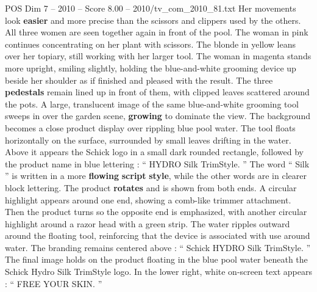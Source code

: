 \begin{textsample}{POS Dim 7 – 2010 – Score 8.00 – 2010/tv\_com\_2010\_81.txt}
Her movements look \textbf{easier} and more precise than the scissors and clippers used by the others.
All three women are seen together again in front of the pool.
The woman in pink continues concentrating on her plant with scissors.
The blonde in yellow leans over her topiary, still working with her larger tool.
The woman in magenta stands more upright, smiling slightly, holding the blue-and-white grooming device up beside her shoulder as if finished and pleased with the result.
The three \textbf{pedestals} remain lined up in front of them, with clipped leaves scattered around the pots.
A large, translucent image of the same blue-and-white grooming tool sweeps in over the garden scene, \textbf{growing} to dominate the view.
The background becomes a close product display over rippling blue pool water.
The tool floats horizontally on the surface, surrounded by small leaves drifting in the water.
Above it appears the Schick logo in a small dark rounded rectangle, followed by the product name in blue lettering : “ HYDRO Silk TrimStyle. ” The word “ Silk ” is written in a more \textbf{flowing} \textbf{script} \textbf{style}, while the other words are in clearer block lettering.
The product \textbf{rotates} and is shown from both ends.
A circular highlight appears around one end, showing a comb-like trimmer attachment.
Then the product turns so the opposite end is emphasized, with another circular highlight around a razor head with a green strip.
The water ripples outward around the floating tool, reinforcing that the device is associated with use around water.
The branding remains centered above : “ Schick HYDRO Silk TrimStyle. ” The final image holds on the product floating in the blue pool water beneath the Schick Hydro Silk TrimStyle logo.
In the lower right, white on-screen text appears : “ FREE YOUR SKIN. ”

\end{textsample}
